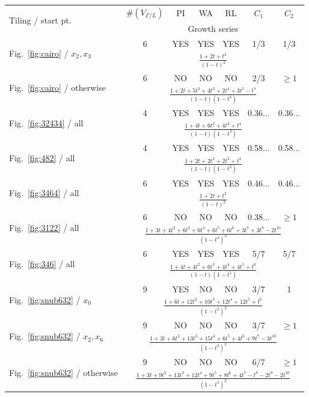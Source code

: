\documentclass[ALCO,published]{cedram}
\theoremstyle{remark}
\begin{document}
\renewcommand{\arraystretch}{1.5}
\begin{table}[ht]

\vspace{5mm}

\centering
\begin{tabular}{l||cccccc} \hline
\multirow{2}{*}{Tiling / start pt.} & $\#(V_{\Gamma /L})$ & PI  & WA & RL &  $C_1$ & $C_2$   \\
& \multicolumn{6}{c}{Growth series} \\
\hline \hline
\multirow{2}{*}{Fig.~\ref{fig:cairo} / $x_2, x_3$} & 6 & YES & YES & YES & 1/3 & 1/3 \\
& \multicolumn{6}{c}{\Large $\frac{1+ 2t + t^2}{(1 - t)^2}$} \\
\hline
\multirow{2}{*}{Fig.~\ref{fig:cairo} / otherwise} & 6 & NO & NO & NO & 2/3 & $\ge 1$ \\
& \multicolumn{6}{c}{\Large $\frac{1+2 t+5 t^{2}+4 t^{3}+2 t^{4}+3 t^{5}-t^{7}}{(1 - t)(1 - t^4)}$} \\
\hline
\multirow{2}{*}{Fig.~\ref{fig:32434} / all} & 4 & YES & YES & YES & 0.36... & 0.36...  \\
& \multicolumn{6}{c}{\Large $\frac{1+4 t+6 t^{2}+4 t^{3}+t^{4}}{(1-t)(1-t^3)}$} \\
\hline
\multirow{2}{*}{Fig.~\ref{fig:482} / all} & 4 & YES & YES & YES & 0.58... & 0.58...  \\
& \multicolumn{6}{c}{\Large $\frac{1+2t+2t^{2}+2t^{3}+t^{4}}{(1-t)(1-t^3)}$} \\
\hline
\multirow{2}{*}{Fig.~\ref{fig:3464} / all} & 6 & YES & YES & YES & 0.46... & 0.46...  \\
& \multicolumn{6}{c}{\Large $\frac{1 + 2t + t^2}{(1-t)^2}$} \\
\hline
\multirow{2}{*}{Fig.~\ref{fig:3122} / all} & 6 & NO & NO & NO & 0.38... & $\ge 1$  \\
& \multicolumn{6}{c}{\Large $\frac{1+3 t+4 t^{2}+6 t^{3}+6 t^{4}+6 t^{5}+6 t^{6}+3 t^{7}+3 t^{8}-2 t^{10}}{(1-t^4)^2}$} \\
\hline
\multirow{2}{*}{Fig.~\ref{fig:346} / all} & 6 & YES & YES & YES & 5/7 & 5/7  \\
& \multicolumn{6}{c}{\Large $\frac{1+4 t +4 t^{2}+6 t^{3}+4 t^{4}+4 t^{5}+t^{6}}{(1-t)(1-t^5)}$} \\
\hline
\multirow{2}{*}{Fig.~\ref{fig:snub632} / $x_0$} & 9 & YES & NO & NO & 3/7 & 1  \\
& \multicolumn{6}{c}{\Large $\frac{1+6 t+12 t^{2}+10 t^{3}+12 t^{4}+12 t^{5}+t^{6}}{(1 - t^3)^2}$} \\
\hline
\multirow{2}{*}{Fig.~\ref{fig:snub632} / $x_2, x_6$} & 9 & NO & NO & NO & 3/7 & $\ge 1$  \\
& \multicolumn{6}{c}{\Large $\frac{1+3 t+6 t^{2}+13 t^{3}+15 t^{4}+6 t^{5}+4 t^{6}+9 t^{7}-3 t^{10}}{(1- t^3)^2}$} \\
\hline
\multirow{2}{*}{Fig.~\ref{fig:snub632} / otherwise} & 9 & NO & NO & NO & 6/7 & $\ge 1$  \\
& \multicolumn{6}{c}{\Large $\frac{1+3 t+9 t^{2}+13 t^{3}+12 t^{4}+9 t^{5}+8 t^{6}+4 t^{7}-t^{8}-2 t^{9}-2 t^{10}}{(1 -t^3)^2}$} \\ 
\hline
\end{tabular}


\end{table}
\end{document}

